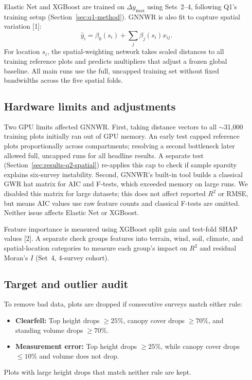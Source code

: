 \documentclass[logo,msc,ai]{infthesis}           %
\begin{document}
Elastic Net and XGBoost are trained on $\Delta y_{\max}$ using Sets~2--4, following Q1's training setup (Section~\ref{sec:q1-method}). GNNWR is also fit to capture spatial variation [1]:
\begin{equation}
\hat y_i=\beta_0(s_i)+\sum_j\beta_j(s_i)x_{ij}.
\label{eq:gnnwr}
\end{equation}
For location $s_i$, the spatial-weighting network takes scaled distances to all training reference plots and predicts multipliers that adjust a frozen global baseline. All main runs use the full, uncapped training set without fixed bandwidths across the five spatial folds.

\subsection*{Hardware limits and adjustments}
Two GPU limits affected GNNWR. First, taking distance vectors to all $\sim$31,000 training plots initially ran out of GPU memory. An early test capped reference plots proportionally across compartments; resolving a second bottleneck later allowed full, uncapped runs for all headline results. A separate test (Section~\ref{sec:results-q2-spatial}) re-applies this cap to check if sample sparsity explains six-survey instability. Second, GNNWR's built-in tool builds a classical GWR hat matrix for AIC and F-tests, which exceeded memory on large runs. We disabled this matrix for large datasets; this does not affect reported $R^2$ or RMSE, but means AIC values use raw feature counts and classical F-tests are omitted. Neither issue affects Elastic Net or XGBoost.

Feature importance is measured using XGBoost split gain and test-fold SHAP values [2]. A separate check groups features into terrain, wind, soil, climate, and spatial-location categories to measure each group's impact on $R^2$ and residual Moran's $I$ (Set~4, 4-survey cohort).

\subsection*{Target and outlier audit}
To remove bad data, plots are dropped if consecutive surveys match either rule:
\begin{itemize}
\setlength\itemsep{2pt}
\item \textbf{Clearfell:} Top height drops $\ge 25\%$, canopy cover drops $\ge 70\%$, and standing volume drops $\ge 70\%$.
\item \textbf{Measurement error:} Top height drops $\ge 25\%$, while canopy cover drops $\le 10\%$ and volume does not drop.
\end{itemize}
Plots with large height drops that match neither rule are kept.
\end{document}
